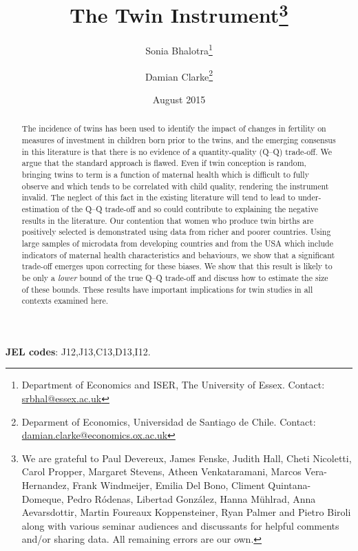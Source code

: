 \documentclass[subeqn]{article}
\title{The Twin Instrument\footnote{We are grateful to Paul Devereux, James 
    Fenske, Judith Hall, Cheti Nicoletti, Carol Propper, Margaret Stevens,
    Atheen Venkataramani, Marcos Vera-Hernandez, Frank Windmeijer,
    Emilia Del Bono, Climent Quintana-Domeque, Pedro R\'odenas, Libertad
    Gonz\'alez, Hanna M\"uhlrad, Anna Aevarsdottir, Martin Foureaux
    Koppensteiner, Ryan Palmer and Pietro Biroli along with various seminar
    audiences and discussants for helpful comments and/or sharing data. All
    remaining errors are our own.}}
\author{Sonia Bhalotra\thanks{Department of Economics and ISER, The University of
    Essex. Contact: \href{mailto:srbhal@essex.ac.uk}{srbhal@essex.ac.uk}} 
\and Damian Clarke\thanks{Deparment of Economics, Universidad de Santiago de Chile.
Contact: \href{mailto:damian.clarke@usach.cl}
{damian.clarke@economics.ox.ac.uk}}}
\date{August 2015}
\begin{document}
\begin{spacing}{1.4}

\maketitle
\vspace{-1cm}
\begin{abstract}
 The incidence of twins has been used to identify the impact of changes in 
 fertility on measures of investment in children born prior to the twins, and
 the emerging consensus in this literature is that there is no evidence of a
 quantity-quality (Q--Q) trade-off. We argue that the standard approach is 
 flawed. Even if twin conception is random, bringing twins to term is a function 
 of maternal health which is difficult to fully observe and which tends to be
 correlated with child quality, rendering the instrument invalid. The neglect
 of this fact in the existing literature will tend to lead to under-estimation 
 of the Q--Q trade-off and so could contribute to explaining the negative results
 in the literature. Our contention that women who produce twin births are
 positively selected is demonstrated using data from richer and poorer countries.
 Using large samples of microdata from developing countries and from the USA 
 which include indicators of maternal health characteristics and behaviours, we
 show that a significant trade-off emerges upon correcting for these biases. We
 show that this result is likely to be only a \emph{lower} bound of the true
 Q--Q trade-off and discuss how to estimate the size of these bounds. These
 results have important implications for twin studies in all contexts examined
 here.
\\
\end{abstract}
\hspace{4mm}\textbf{\small JEL codes}: J12,J13,C13,D13,I12. \\

\newpage

\end{spacing}
\end{document}
